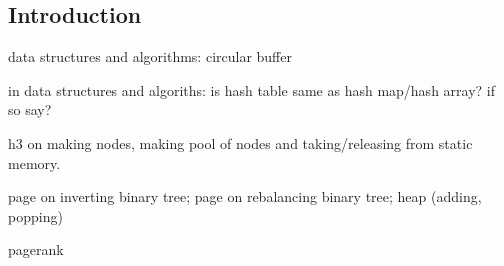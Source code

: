 
\subsection{Introduction}

data structures and algorithms: circular buffer

in data structures and algoriths: is hash table same as hash map/hash array? if so say?

h3 on making nodes, making pool of nodes and taking/releasing from static memory.

page on inverting binary tree; page on rebalancing binary tree; heap (adding, popping)

pagerank


